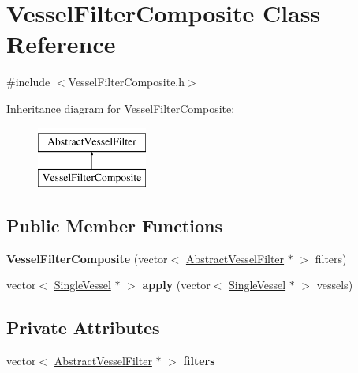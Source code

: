 \hypertarget{class_vessel_filter_composite}{}\section{Vessel\+Filter\+Composite Class Reference}
\label{class_vessel_filter_composite}


{\ttfamily \#include $<$Vessel\+Filter\+Composite.\+h$>$}

Inheritance diagram for Vessel\+Filter\+Composite\+:\begin{figure}[H]
\begin{center}
\leavevmode
\includegraphics[height=2.000000cm]{d9/d3b/class_vessel_filter_composite}
\end{center}
\end{figure}
\subsection*{Public Member Functions}
\begin{DoxyCompactItemize}
\item 
{\bfseries Vessel\+Filter\+Composite} (vector$<$ \hyperlink{class_abstract_vessel_filter}{Abstract\+Vessel\+Filter} $\ast$ $>$ filters)\hypertarget{class_vessel_filter_composite_a5bc111a54d7cedcabb3bd84fec4b369b}{}\label{class_vessel_filter_composite_a5bc111a54d7cedcabb3bd84fec4b369b}

\item 
vector$<$ \hyperlink{class_single_vessel}{Single\+Vessel} $\ast$ $>$ {\bfseries apply} (vector$<$ \hyperlink{class_single_vessel}{Single\+Vessel} $\ast$ $>$ vessels)\hypertarget{class_vessel_filter_composite_a64cbf86a5abef6cb9cce717d38f50759}{}\label{class_vessel_filter_composite_a64cbf86a5abef6cb9cce717d38f50759}

\end{DoxyCompactItemize}
\subsection*{Private Attributes}
\begin{DoxyCompactItemize}
\item 
vector$<$ \hyperlink{class_abstract_vessel_filter}{Abstract\+Vessel\+Filter} $\ast$ $>$ {\bfseries filters}\hypertarget{class_vessel_filter_composite_ab5050a7510ed9d1a8d790ddfd906d102}{}\label{class_vessel_filter_composite_ab5050a7510ed9d1a8d790ddfd906d102}

\end{DoxyCompactItemize}


